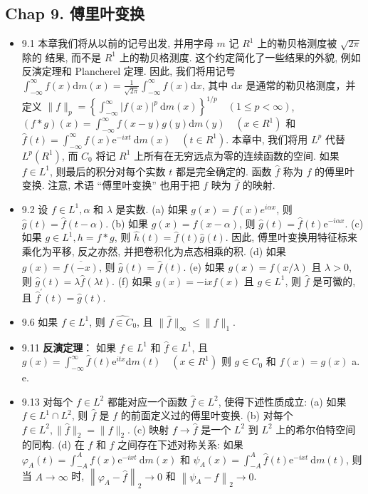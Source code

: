 \subsection{Chap 9. 傅里叶变换}

\begin{itemize}
\item 9.1 本章我们将从以前的记号出发, 并用字母 $m$ 记 $R^{1}$ 上的勒贝格测度被 $\sqrt{2 \pi}$ 除的 结果, 而不是 $R^{1}$ 上的勒贝格测度. 这个约定简化了一些结果的外貌, 例如反演定理和 Plancherel 定理. 因此, 我们将用记号 $\int_{-\infty}^{\infty} f(x) \mathrm{d} m(x)=\frac{1}{\sqrt{2 \pi}} \int_{-\infty}^{\infty} f(x) \mathrm{d} x$, 其中 $\mathrm{d} x$ 是通常的勒贝格测度，并定义 $\|f\|_{p}=\left\{\int_{-\infty}^{\infty}|f(x)|^{p} \mathrm{~d} m(x)\right\}^{1 / p} \quad(1 \leqslant p<\infty)$, $(f * g)(x)=\int_{-\infty}^{\infty} f(x-y) g(y) \mathrm{d} m(y) \quad\left(x \in R^{1}\right)$ 和 $\hat{f}(t)=\int_{-\infty}^{\infty} f(x) \mathrm{e}^{-i xt} \mathrm{~d} m(x) \quad\left(t \in R^{1}\right)$. 本章中, 我们将用 $L^{p}$ 代替 $L^{p}\left(R^{1}\right)$, 而 $C_{0}$ 将记 $R^{1}$ 上所有在无穷远点为零的连续函数的空间. 如果 $f \in L^{1}$, 则最后的积分对每个实数 $t$ 都是完全确定的. 函数 $\hat{f}$ 称为 $f$ 的傅里叶变换. 注意, 术语 “傅里叶变换” 也用于把 $f$ 映为 $\hat{f}$ 的映射.

\item 9.2 设 $f \in L^{1}, \alpha$ 和 $\lambda$ 是实数. (a) 如果 $g(x)=f(x) e^{i \alpha x}$, 则 $\hat{g}(t)=\hat{f}(t-\alpha)$. (b) 如果 $g(x)=f(x-\alpha)$, 则 $\hat{g}(t)=\hat{f}(t) \mathrm{e}^{-i\alpha x}$. (c) 如果 $g \in L^{1}, h=f * g$, 则 $\hat{h}(t)=\hat{f}(t) \hat{g}(t)$. 因此, 傅里叶变换用特征标来乘化为平移, 反之亦然, 并把卷积化为点态相乘的积. (d) 如果 $g(x)=\overline{f(-x)}$, 则 $\hat{g}(t)=\overline{\hat{f}(t)}$. (e) 如果 $g(x)=f(x / \lambda)$ 且 $\lambda>0$, 则 $\hat{g}(t)=\lambda \hat{f}(\lambda t)$. (f) 如果 $g(x)=-\mathrm{i} x f(x)$ 且 $g \in L^{1}$, 则 $\hat{f}$ 是可徽的, 且 $\hat{f}^{\prime}(t)=\hat{g}(t)$.

\item 9.6 如果 $f \in L^{1}$, 则 $\hat{f \in C_{0}}$, 且 $\|\hat{f}\|_{\infty} \leqslant\|f\|_{1}$.

\item 9.11 \textbf{反演定理}： 如果 $f \in L^{1}$ 和 $\hat{f} \in L^{1}$, 且 $g(x)=\int_{-\infty}^{\infty} \hat{f}(t) \mathrm{e}^{itx} \mathrm{d} m(t) \quad\left(x \in R^{1}\right)$ 则 $g \in C_{0}$ 和 $f(x)=g(x)$ a. e.

\item 9.13 对每个 $f \in L^{2}$ 都能对应一个函数 $\hat{f} \in L^{2}$, 使得下述性质成立: (a) 如果 $f \in L^{1} \cap L^{2}$, 则 $\hat{f}$ 是 $f$ 的前面定义过的傅里叶变换. (b) 对每个 $f \in L^{2},\|\hat{f}\|_{2}=\|f\|_{2}$. (c) 映射 $f \rightarrow \hat{f}$ 是一个 $L^{2}$ 到 $L^{2}$ 上的希尔伯特空间的同构. (d) 在 $f$ 和 $\hat{f}$ 之间存在下述对称关系: 如果 $\varphi_{A}(t)=\int_{-A}^{A} f(x) \mathrm{e}^{-ixt} \mathrm{~d} m(x)$ 和 $\psi_{A}(x)=\int_{-A}^{A} \hat{f}(t) \mathrm{e}^{-ix t} \mathrm{~d} m(t)$, 则当 $A \rightarrow \infty$ 时, $\left\|\varphi_{A}-\hat{f}\right\|_{2} \rightarrow 0$ 和 $\left\|\psi_{A}-f\right\|_{2} \rightarrow 0$.


\end{itemize}

